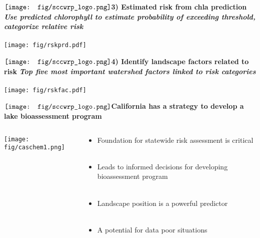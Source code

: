 \documentclass[serif]{beamer}\usepackage[]{graphicx}\usepackage[]{color}
\newcommand{\emtxt}[1]{\textbf{\textit{{\color{mypal4} #1}}}}
\begin{document}
\begin{frame}{{$\vcenter{\hbox{\texttt{[image: fig/sccwrp\_logo.png]}}}$\hspace{0.07in}\textbf{3) Estimated risk from chla prediction}}}
\emtxt{Use predicted chlorophyll to estimate probability of exceeding threshold, categorize relative risk} \\~\\
\texttt{[image: fig/rskprd.pdf]}
\end{frame}



\begin{frame}{{$\vcenter{\hbox{\texttt{[image: fig/sccwrp\_logo.png]}}}$\hspace{0.07in}\textbf{4) Identify landscape factors related to risk}}}
\emtxt{Top five most important watershed factors linked to risk categories} \\~\\
\texttt{[image: fig/rskfac.pdf]}
\end{frame}

\begin{frame}{{$\vcenter{\hbox{\texttt{[image: fig/sccwrp\_logo.png]}}}$\hspace{0.07in}\textbf{California has a strategy to develop a lake bioassessment program}}}
\begin{columns}
\begin{column}{0.5\textwidth}
\centering
{}
\texttt{[image: fig/caschem1.png]}
\end{column}
\begin{column}{0.5\textwidth}
\begin{itemize}
\item<1->Foundation for statewide risk assessment is critical\\~\\
\item<2->Leads to informed decisions for developing bioassessment program\\~\\
\item<3->Landscape position is a powerful predictor\\~\\
\item<4->A potential for data poor situations
\end{itemize}
\end{column}
\end{columns}
\end{frame}
\end{document}
